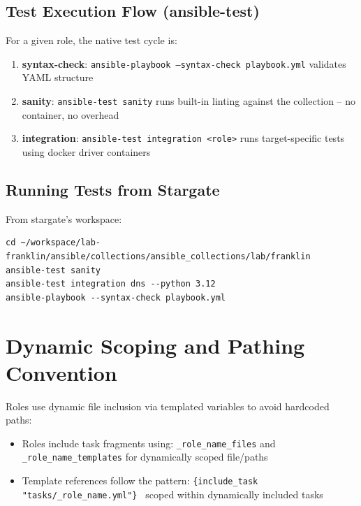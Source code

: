 \subsection{Test Execution Flow (ansible-test)}

For a given role, the native test cycle is:
\begin{enumerate}
    \item \textbf{syntax-check}: \texttt{ansible-playbook --syntax-check playbook.yml} validates YAML structure
    
    \item \textbf{sanity}: \texttt{ansible-test sanity} runs built-in linting against the collection -- no container, no overhead
    
    \item \textbf{integration}: \texttt{ansible-test integration <role>} runs target-specific tests using docker driver containers
\end{enumerate}

\subsection{Running Tests from Stargate}

From stargate's workspace:
\begin{lstlisting}[style=mystyle]
cd ~/workspace/lab-franklin/ansible/collections/ansible_collections/lab/franklin
ansible-test sanity
ansible-test integration dns --python 3.12
ansible-playbook --syntax-check playbook.yml
    \end{lstlisting}

\section{Dynamic Scoping and Pathing Convention}

Roles use dynamic file inclusion via templated variables to avoid hardcoded paths:

\begin{itemize}
    \item Roles include task fragments using: \texttt{{\_role\_name\_files}} and \texttt{{\_role\_name\_templates}} for dynamically scoped file/paths
    
    \item Template references follow the pattern: \texttt{\{include\_task "tasks/\_role\_name.yml"\} } scoped within dynamically included tasks
\end{itemize}

